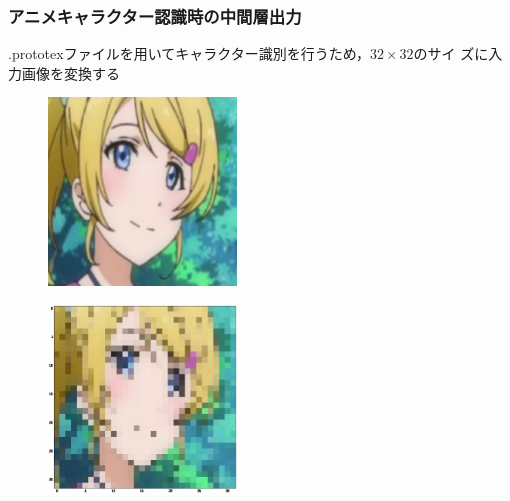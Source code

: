 \documentclass[dvipdfmx,11pt,notheorems]{beamer}
\theoremstyle{definition}
\begin{document}
\begin{frame}\frametitle{アニメキャラクター認識時の中間層出力}
.prototexファイルを用いてキャラクター識別を行うため，$32\times 32$のサイ
ズに入力画像を変換する
\begin{figure}[t]
 \begin{minipage}{0.45\hsize}
  \centering
  \includegraphics[width=50mm]{./fig/eps/eri.eps} \\
 \end{minipage}
 \begin{minipage}{0.45\hsize}
  \centering
  \includegraphics[width=50mm]{./fig/eps/inputeri.eps}\\
 \end{minipage}
\end{figure}

\end{frame}
\end{document}
